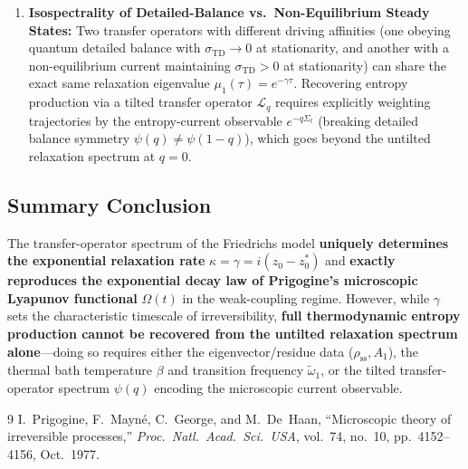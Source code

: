 \documentclass[11pt,a4paper]{article}
\begin{document}
\begin{enumerate}
    \item \textbf{Isospectrality of Detailed-Balance vs.\ Non-Equilibrium Steady States:}
    Two transfer operators with different driving affinities (one obeying quantum detailed balance with $\sigma_{\mathrm{TD}} \to 0$ at stationarity, and another with a non-equilibrium current maintaining $\sigma_{\mathrm{TD}} > 0$ at stationarity) can share the exact same relaxation eigenvalue $\mu_1(\tau) = e^{-\gamma \tau}$. Recovering entropy production via a tilted transfer operator $\mathcal{L}_q$ requires explicitly weighting trajectories by the entropy-current observable $e^{-q\Sigma_t}$ (breaking detailed balance symmetry $\psi(q) \neq \psi(1-q)$), which goes beyond the untilted relaxation spectrum at $q = 0$.
\end{enumerate}

\subsection{Summary Conclusion}
The transfer-operator spectrum of the Friedrichs model \textbf{uniquely determines the exponential relaxation rate} $\kappa = \gamma = i(z_0 - z_0^*)$ and \textbf{exactly reproduces the exponential decay law of Prigogine's microscopic Lyapunov functional} $\Omega(t)$ in the weak-coupling regime. However, while $\gamma$ sets the characteristic timescale of irreversibility, \textbf{full thermodynamic entropy production cannot be recovered from the untilted relaxation spectrum alone}---doing so requires either the eigenvector/residue data ($\rho_{\mathrm{ss}}, A_1$), the thermal bath temperature $\beta$ and transition frequency $\tilde{\omega}_1$, or the tilted transfer-operator spectrum $\psi(q)$ encoding the microscopic current observable.

\begin{thebibliography}{9}
I.~Prigogine, F.~Mayn\'e, C.~George, and M.~De~Haan, ``Microscopic theory of irreversible processes,'' \emph{Proc.\ Natl.\ Acad.\ Sci.\ USA}, vol.~74, no.~10, pp.~4152--4156, Oct.\ 1977.
\end{thebibliography}
\end{document}
